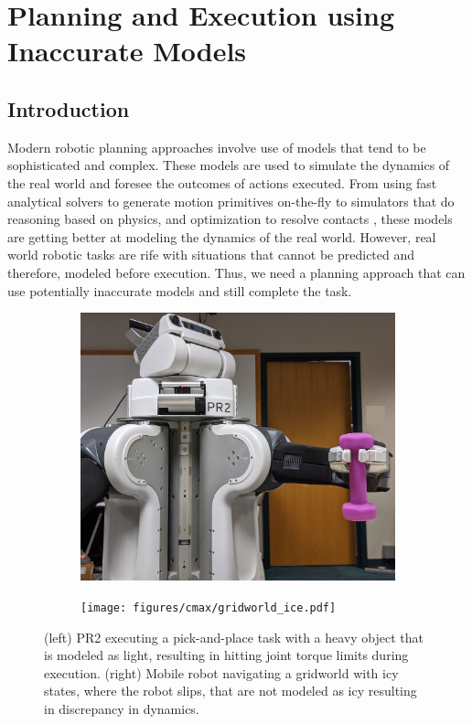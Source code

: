 \chapter{Planning and Execution using Inaccurate Models}
\label{cha:plann-exec}


\section{Introduction}
\label{sec:introduction}

Modern robotic planning approaches involve use of models that tend to
be sophisticated and complex. These models are used to simulate the
dynamics of the real world and foresee the outcomes of actions
executed. From using fast analytical solvers to generate motion
primitives on-the-fly \cite{DBLP:conf/icra/CohenSCL11} to 
simulators that do reasoning based on physics, and optimization to resolve
contacts \cite{DBLP:conf/iros/TodorovET12}, these models are getting better at
modeling the dynamics of the real world. However, real world robotic
tasks are rife with situations that cannot be predicted and therefore,
modeled before execution. Thus, we need a
planning approach that can use potentially inaccurate models and still
complete the task.

\begin{figure}[t]
  \centering
  \begin{subfigure}{.5\columnwidth}
    \includegraphics[width=\linewidth]{figures/cmax/pr2_dumbbell_full.jpg}
  \end{subfigure}
  \begin{subfigure}{.4\columnwidth}
    \texttt{[image: figures/cmax/gridworld\_ice.pdf]}
  \end{subfigure}  
  \caption{(left) PR2 executing a pick-and-place task with a heavy
    object that is modeled as light, resulting in hitting joint torque
    limits during execution. (right) Mobile
    robot navigating a gridworld with icy states, where the robot slips, that are not modeled
    as icy resulting in discrepancy in dynamics.}
  \label{fig:intro}
  
\end{figure}

